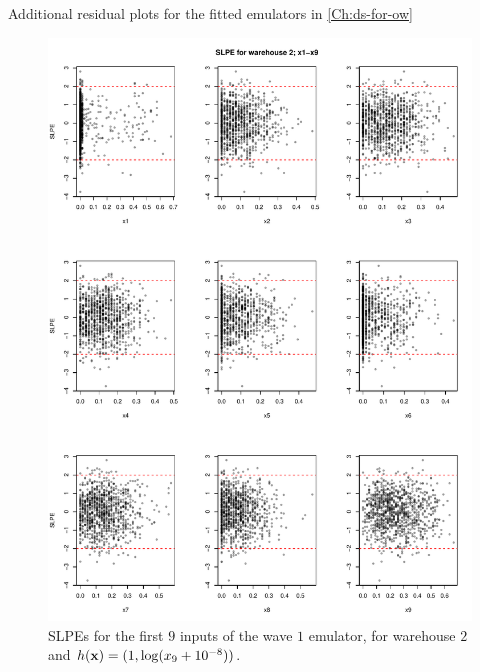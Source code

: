 \begin{chapter}{Additional residual plots  for the fitted emulators in \cref{Ch:ds-for-ow} \label{App:resid}}
\begin{figure}
  \includegraphics[width=\textwidth]{fig-app-ds/w1-w2-mean1.pdf}
  \caption{SLPEs for the first $9$ inputs of the wave $1$ emulator, for warehouse $2$ and $h(\mathbf{x}) = (1, \log (x_9 + 10^{-8}))$.}
\end{figure}


\end{chapter}
